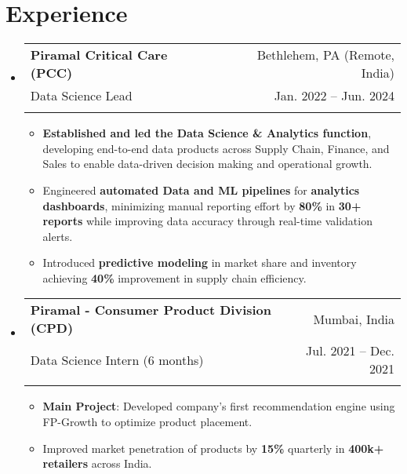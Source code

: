\documentclass[letter paper,11pt]{article}
\makeatletter
\newcommand{\resumeItem}[1]{
\justifying
\vspace{-3pt}
  \item\small{
    {#1}
  }
}
\newcommand{\resumeSubheading}[5]{%
  \item
    \begin{tabular*}
    {1\textwidth}
    {l@{\extracolsep{\fill}}r}
      \textbf{#1} & \small#2 \\
      {\small#3} & {\small #4} \\
      {\small#5}
    \end{tabular*}%
  \vspace{-0.95cm}
}
\newcommand{\resumeSubHeadingListStart}{\begin{itemize}[leftmargin=0.0in, label={}]}
\newcommand{\resumeSubHeadingListEnd}{\end{itemize}}
\newcommand{\resumeItemListStart}{\begin{itemize}}
\newcommand{\resumeItemListEnd}{\end{itemize}}
\makeatother
\begin{document}
\section{Experience}
  \resumeSubHeadingListStart
    \resumeSubheading
    {Piramal Critical Care (PCC)}
    {Bethlehem, PA (Remote, India)}
    {Data Science Lead}
    {Jan. 2022 -- Jun. 2024}{}
    
    \resumeItemListStart
    \resumeItem{\textbf{Established and led the Data Science \& Analytics function}, developing end-to-end data products across Supply Chain, Finance, and Sales to enable data-driven decision making and operational growth.}
    \resumeItem{Engineered \textbf{automated Data and ML pipelines} for \textbf{analytics dashboards}, minimizing manual reporting effort by \textbf{80\%} in \textbf{30+ reports} while improving data accuracy through real-time validation alerts.}
    \resumeItem{Introduced \textbf{predictive modeling} in market share and inventory achieving \textbf{40\%} improvement in supply chain efficiency.
    }
    
    \resumeItemListEnd

    \vspace{-10px}
    \resumeSubheading
    {\textbf{Piramal - Consumer Product Division (CPD)}}{Mumbai, India}
    {Data Science Intern (6 months)}{Jul. 2021 -- Dec. 2021}{}
    
    \resumeItemListStart
    \resumeItem{\textbf{Main Project}: Developed company's first recommendation engine using FP-Growth to optimize product placement.}
\resumeItem{Improved market penetration of products by \textbf{15\%} quarterly in \textbf{400k+ retailers} across India.}

    \resumeItemListEnd
\resumeSubHeadingListEnd



\end{document}
